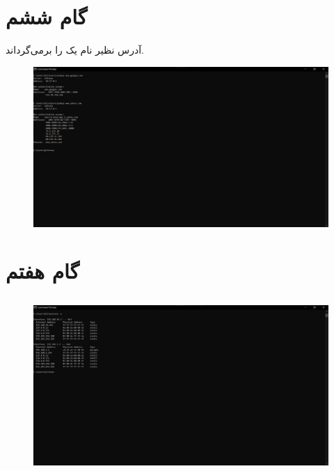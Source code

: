 \documentclass{article}
\begin{document}
\section{گام ششم}
 آدرس  نظیر نام یک  را برمی‌گرداند.
\begin{figure}[H]
    \centering
    \includegraphics[width=1.0\textwidth]{figures/6.1.jpg}
    \caption
	{
	}
    \label{fig:fig1}
\end{figure}

\section{گام هفتم}
\subsection{}
\begin{figure}[H]
    \centering
    \includegraphics[width=1.0\textwidth]{figures/7.1.jpg}
    \caption
	{
	}
    \label{fig:fig1}
\end{figure}
\end{document}
